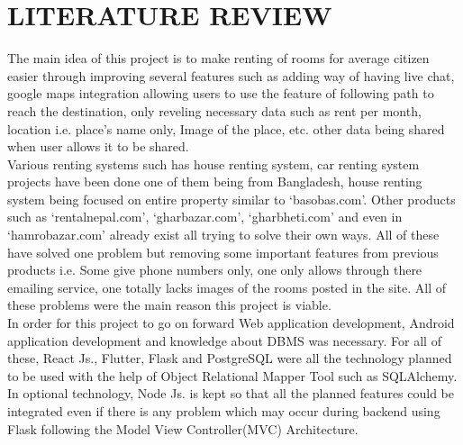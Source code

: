 \chapter{LITERATURE REVIEW}
The main idea of this project is to make renting of rooms for average citizen easier through improving several features such as adding way of having live chat, google maps integration allowing users to use the feature of following path to reach the destination, only reveling necessary data such as rent per month, location i.e. place’s name only, Image of the place, etc. other data being shared when user allows it to be shared. \\
Various renting systems such has house renting system\cite{houserent}, car renting system projects have been done one of them being from Bangladesh, house renting system being focused on entire property similar to ‘basobas.com’. Other products such as ‘rentalnepal.com’, ‘gharbazar.com’, ‘gharbheti.com’ and even in ‘hamrobazar.com’ already exist all trying to solve their own ways. All of these have solved one problem but removing some important features from previous products i.e. Some give phone numbers only, one only allows through there emailing service, one totally lacks images of the rooms posted in the site. All of these problems were the main reason this project is viable. \\
In order for this project to go on forward Web application development, Android application development and knowledge about DBMS was necessary. For all of these, React Js., Flutter, Flask and PostgreSQL were all the technology planned to be used with the help of Object Relational Mapper Tool such as SQLAlchemy. In optional technology, Node Js. is kept so that all the planned features could be integrated even if there is any problem which may occur during backend using Flask following the Model View Controller(MVC) Architecture.
